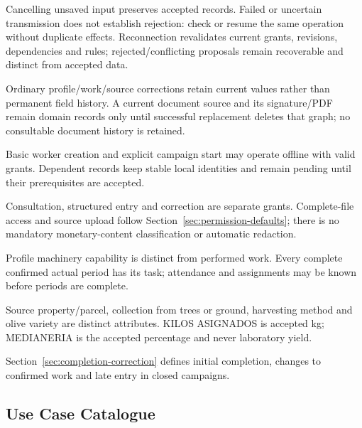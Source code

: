 \begin{description}
Cancelling unsaved input preserves accepted records. Failed or uncertain transmission
does not establish rejection: check or resume the same operation without duplicate
effects. Reconnection revalidates current grants, revisions, dependencies and rules;
rejected/conflicting proposals remain recoverable and distinct from accepted data.
\item[Current values and domain records.] Ordinary profile/work/source corrections retain current values rather than permanent field history. A current document source and its signature/PDF remain domain records only until successful replacement deletes that graph; no consultable document history is retained.
\item[Offline creation.] Basic worker creation and explicit campaign start may
operate offline with valid grants. Dependent records keep stable local identities
and remain pending until their prerequisites are accepted.
\item[Financial information.] Consultation, structured entry and correction are
separate grants. Complete-file access and source upload follow Section~\ref{sec:permission-defaults};
there is no mandatory monetary-content classification or automatic redaction.
\item[Task and capability.] Profile machinery capability is distinct from performed
work. Every complete confirmed actual period has its task; attendance and assignments
may be known before periods are complete.
\item[Provenance and collection.] Source property/parcel, collection from trees or ground, harvesting method and olive variety are distinct attributes. KILOS ASIGNADOS is accepted kg; MEDIANERIA is the accepted percentage and never laboratory yield.
\item[Completion and correction.] Section~\ref{sec:completion-correction} defines
initial completion, changes to confirmed work and late entry in closed campaigns.
\end{description}

\subsection{Use Case Catalogue}

